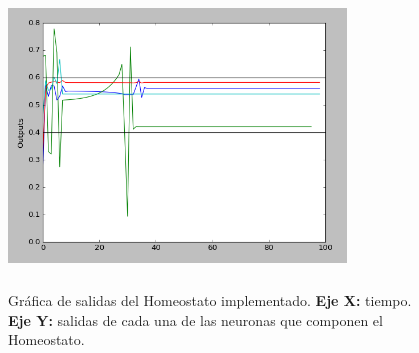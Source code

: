 \begin{figure}[H]
    \centering
    \includegraphics[width=0.8\textwidth,height=8cm]{Imagenes/CustomHomeostat}
    \caption{Gráfica de salidas del Homeostato implementado. \textbf{Eje X:} tiempo. \textbf{Eje Y: } salidas de cada una de las neuronas que componen el Homeostato.}
    \label{fig:customHomeostat}
\end{figure}

